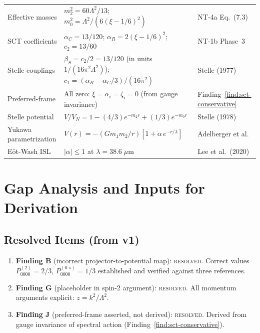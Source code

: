 \documentclass[11pt,a4paper]{article}
\theoremstyle{plain}
\theoremstyle{definition}
\theoremstyle{remark}
\begin{document}
\begin{center}
\begin{longtable}{p{3.5cm}p{7cm}p{2.5cm}}
Effective masses &
  $m_2^2 = 60\Lambda^2/13$;
  $m_0^2 = \Lambda^2/(6(\xi-1/6)^2)$ &
  NT-4a Eq.~(7.3) \\
SCT coefficients &
  $\alpha_C = 13/120$; $\alpha_R = 2(\xi-1/6)^2$;
  $c_2 = 13/60$ &
  NT-1b Phase~3 \\
Stelle couplings &
  $\beta_S = c_2/2 = 13/120$ (in units $1/(16\pi^2\Lambda^2)$);
  $c_1 = (\alpha_R - \alpha_C/3)/(16\pi^2)$ &
  Stelle (1977) \\
Preferred-frame &
  All zero: $\xi = \alpha_i = \zeta_i = 0$ (from gauge invariance) &
  Finding~\ref{find:sct-conservative} \\
Stelle potential &
  $V/V_N = 1 - (4/3)e^{-m_2 r} + (1/3)e^{-m_0 r}$ &
  Stelle (1978) \\
Yukawa parametrization &
  $V(r) = -(Gm_1 m_2/r)[1 + \alpha\,e^{-r/\lambda}]$ &
  Adelberger et al. \\
E\"ot-Wash ISL &
  $|\alpha| \leq 1$ at $\lambda = 38.6\;\mu$m &
  Lee et al.\ (2020) \\
\bottomrule
\end{longtable}
\end{center}


\section{Gap Analysis and Inputs for Derivation}\label{sec:gaps}

\subsection{Resolved Items (from v1)}

\begin{enumerate}[nosep]
  \item \textbf{Finding B} (incorrect projector-to-potential map):
    \textsc{resolved.}  Correct values
    $P^{(2)}_{0000} = 2/3$, $P^{(0\text{-}s)}_{0000} = 1/3$
    established and verified against three references.
  \item \textbf{Finding G} (placeholder in spin-2 argument):
    \textsc{resolved.}  All momentum arguments explicit:
    $z = k^2/\Lambda^2$.
  \item \textbf{Finding J} (preferred-frame asserted, not derived):
    \textsc{resolved.}  Derived from gauge invariance of spectral
    action (Finding~\ref{find:sct-conservative}).
\end{enumerate}
\end{document}
